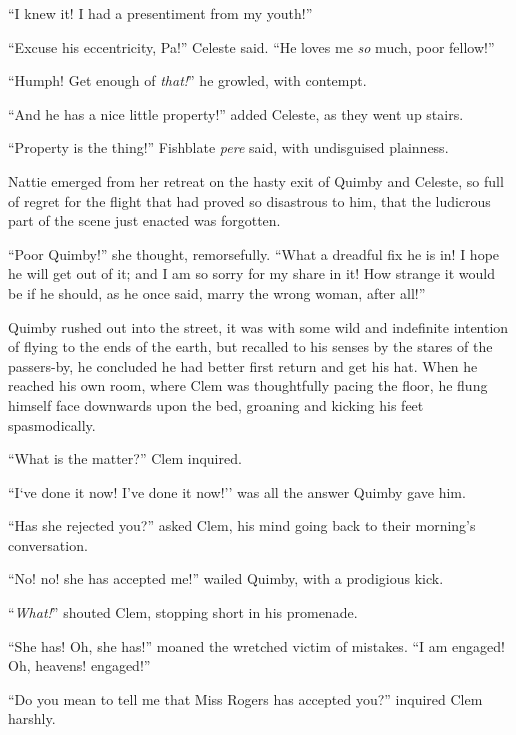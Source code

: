 ``I knew it! I had a presentiment from my youth!''

``Excuse his eccentricity, Pa!'' Celeste said. ``He loves me \emph{so} much, poor
fellow!''

``Humph! Get enough of \emph{that!}'' he growled, with contempt.

``And he has a nice little property!'' added Celeste, as they went up
stairs.

``Property is the thing!'' Fishblate \emph{pere} said, with undisguised
plainness.

Nattie emerged from her retreat on the hasty exit of Quimby and Celeste,
so full of regret for the flight that had proved so disastrous to him,
that the ludicrous part of the scene just enacted was forgotten.

``Poor Quimby!'' she thought, remorsefully. ``What a dreadful fix he is in!
I hope he will get out of it; and I am so sorry for my share in it! How
strange it would be if he should, as he once said, marry the wrong
woman, after all!''








 Quimby rushed out into the street, it was with some wild and
indefinite intention of flying to the ends of the earth, but recalled to
his senses by the stares of the passers-by, he concluded he had better
first return and get his hat. When he reached his own room, where Clem
was thoughtfully pacing the floor, he flung himself face downwards upon
the bed, groaning and kicking his feet spasmodically.

``What is the matter?'' Clem inquired.

``I`ve done it now! I've done it now!'' was all the answer Quimby gave
him.

``Has she rejected you?'' asked Clem, his mind going back to their
morning's conversation.

``No! no! she has accepted me!'' wailed Quimby, with a prodigious kick.

``\emph{What!}'' shouted Clem, stopping short in his promenade.

``She has! Oh, she has!'' moaned the wretched victim of mistakes. ``I am
engaged! Oh, heavens! engaged!''

``Do you mean to tell me that Miss Rogers has accepted you?'' inquired
Clem harshly.

